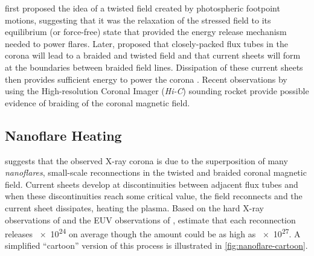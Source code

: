 \citet{gold_magnetic_1964} first proposed the idea of a twisted field created by photospheric footpoint motions, suggesting that it was the relaxation of the stressed field to its equilibrium (or force-free) state that provided the energy release mechanism needed to power flares. Later, \citet{parker_topological_1972} proposed that closely-packed flux tubes in the corona will lead to a braided and twisted field and that current sheets will form at the boundaries between braided field lines. Dissipation of these current sheets then provides sufficient energy to power the corona \citep{parker_magnetic_1983,parker_magnetic_1983-1}. Recent observations by \citet{cirtain_energy_2013} using the High-resolution Coronal Imager (\textit{Hi-C}) sounding rocket provide possible evidence of braiding of the coronal magnetic field.

\subsection{Nanoflare Heating}\label{sec:nanoflares}

\citet{parker_nanoflares_1988} suggests that the observed X-ray corona is due to the superposition of many \textit{nanoflares}, small-scale reconnections in the twisted and braided coronal magnetic field. Current sheets develop at discontinuities between adjacent flux tubes and when these discontinuities reach some critical value, the field reconnects and the current sheet dissipates, heating the plasma. Based on the hard X-ray observations of \citet{lin_solar_1984} and the EUV observations of \citet{brueckner_observations_1983}, \citeauthor{parker_nanoflares_1988} estimate that each reconnection releases \SI{e24}{\erg} on average though the amount could be as high as \SI{e27}{\erg}. A simplified ``cartoon'' version of this process is illustrated in \autoref{fig:nanoflare-cartoon}.

